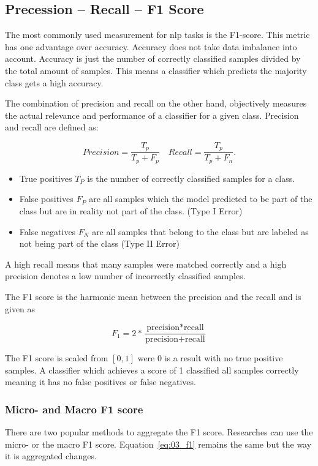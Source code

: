 \subsection{Precession -- Recall -- F1 Score}
The most commonly used measurement for \gls{nlp} tasks is the F1-score. This metric has one advantage over accuracy. Accuracy does not take data imbalance into account. Accuracy is just the number of correctly classified samples divided by the total amount of samples. This means a classifier which predicts the majority class gets a high accuracy.
\medskip

The combination of precision and recall on the other hand, objectively measures the actual relevance and performance of a classifier for a given class. Precision and recall are defined as:

\begin{equation}
Precision = \frac{T_p}{T_p+F_p} \quad Recall = \frac{T_p}{T_p+F_n}.
\end{equation}

\begin{itemize}
    \item True positives $T_P$ is the number of correctly classified samples for a class.
    \item False positives $F_P$ are all samples which the model predicted to be part of the class but are in reality not part of the class. {(Type I Error)}
    \item False negatives $F_N$ are all samples that belong to the class but are labeled as not being part of the class {(Type II Error)}
\end{itemize}

A high recall means that many samples were matched correctly and a high precision denotes a low number of incorrectly classified samples.
\medskip

The F1 score is the harmonic mean between the precision and the recall and is given as

\begin{equation}
    F_1 = 2 * \frac{\text{precision}*\text{recall}}{\text{precision}+\text{recall}}
\label{eq:03_f1}
\end{equation}

The F1 score is scaled from $[0, 1]$ were 0 is a result with no true positive samples. A classifier which achieves a score of 1 classified all samples correctly meaning it has no false positives or false negatives.

\subsubsection*{Micro- and Macro F1 score}
\label{sec:03_macroMicroF1}
There are two popular methods to aggregate the F1 score. Researches can use the micro- or the macro F1 score. Equation~\ref{eq:03_f1} remains the same but the way it is aggregated changes. 
\medskip

